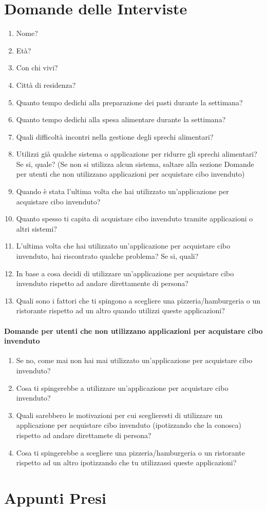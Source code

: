 \documentclass[a4paper,12pt]{article}
\begin{document}
\section{Domande delle Interviste}
\begin{enumerate}
    \item Nome?
    \item Età?
    \item Con chi vivi?
    \item Città di residenza?
    \item Quanto tempo dedichi alla preparazione dei pasti durante la settimana?
    \item Quanto tempo dedichi alla spesa alimentare durante la settimana?
    \item Quali difficoltà incontri nella gestione degli sprechi alimentari?
    \item Utilizzi già qualche sistema o applicazione per ridurre gli sprechi alimentari? Se si, quale? (Se non si utilizza alcun sistema, saltare alla sezione Domande per utenti che non utilizzano applicazioni per acquistare cibo invenduto)
    \item Quando è stata l'ultima volta che hai utilizzato un'applicazione per acquistare cibo invenduto?
    \item Quanto spesso ti capita di acquistare cibo invenduto tramite applicazioni o altri sistemi?
    \item L'ultima volta che hai utilizzato un'applicazione per acquistare cibo invenduto, hai riscontrato qualche problema? Se si, quali?
    \item In base a cosa decidi di utilizzare un'applicazione per acquistare cibo invenduto rispetto ad andare direttamente di persona?
    \item Quali sono i fattori che ti spingono a scegliere una pizzeria/hamburgeria o un ristorante rispetto ad un altro quando utilizzi queste applicazioni?
\end{enumerate}

\paragraph{Domande per utenti che non utilizzano applicazioni per acquistare cibo invenduto}
\begin{enumerate}
    \item Se no, come mai non hai mai utilizzato un'applicazione per acquistare cibo invenduto?
    \item Cosa ti spingerebbe a utilizzare un'applicazione per acquistare cibo invenduto?
    \item Quali sarebbero le motivazioni per cui sceglieresti di utilizzare un applicazione per acquistare cibo invenduto (ipotizzando che la conosca) rispetto ad andare direttamete di persona?
    \item Cosa ti spingerebbe a scegliere una pizzeria/hamburgeria o un ristorante rispetto ad un altro ipotizzando che tu utilizzassi queste applicazioni?
\end{enumerate}

\section{Appunti Presi}
\end{document}
